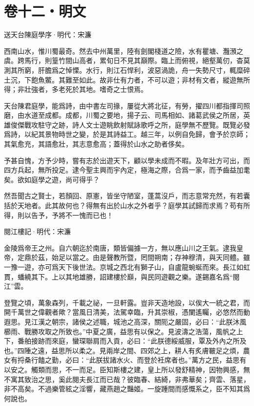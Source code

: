 \documentclass[12pt,a4paper]{ctexbook}
\begin{document}
\section{卷十二・明文}
送天台陳庭學序·明代：宋濂 \par
西南山水，惟川蜀最奇。然去中州萬里，陸有劍閣棧道之險，水有瞿塘、灩澦之虞。跨馬行，則篁竹間山高者，累旬日不見其巔際。臨上而俯視，絕壑萬仞，杳莫測其所窮，肝膽爲之悼慄。水行，則江石悍利，波惡渦詭，舟一失勢尺寸，輒糜碎土沉，下飽魚鱉。其難至如此。故非仕有力者，不可以遊；非材有文者，縱遊無所得；非壯強者，多老死於其地。嗜奇之士恨焉。\par
天台陳君庭學，能爲詩，由中書左司掾，屢從大將北征，有勞，擢四川都指揮司照磨，由水道至成都。成都，川蜀之要地，揚子云、司馬相如、諸葛武侯之所居，英雄俊傑戰攻駐守之跡，詩人文士遊眺飲射賦詠歌呼之所，庭學無不歷覽。既覽必發爲詩，以紀其景物時世之變，於是其詩益工。越三年，以例自免歸，會予於京師；其氣愈充，其語愈壯，其志意愈高；蓋得於山水之助者侈矣。\par
予甚自愧，方予少時，嘗有志於出遊天下，顧以學未成而不暇。及年壯方可出，而四方兵起，無所投足。逮今聖主興而宇內定，極海之際，合爲一家，而予齒益加耄矣。欲如庭學之遊，尚可得乎？\par
然吾聞古之賢士，若顏回、原憲，皆坐守陋室，蓬蒿沒戶，而志意常充然，有若囊括於天地者。此其故何也？得無有出於山水之外者乎？庭學其試歸而求焉？苟有所得，則以告予，予將不一愧而已也！\par
閱江樓記·明代：宋濂 \par
金陵爲帝王之州。自六朝迄於南唐，類皆偏據一方，無以應山川之王氣。逮我皇帝，定鼎於茲，始足以當之。由是聲教所暨，罔間朔南；存神穆清，與天同體。雖一豫一遊，亦可爲天下後世法。京城之西北有獅子山，自盧龍蜿蜒而來。長江如虹貫，蟠繞其下。上以其地雄勝，詔建樓於巔，與民同遊觀之樂。遂錫嘉名爲“閱江”雲。\par
登覽之頃，萬象森列，千載之祕，一旦軒露。豈非天造地設，以俟大一統之君，而開千萬世之偉觀者歟？當風日清美，法駕幸臨，升其崇椒，憑闌遙矚，必悠然而動遐思。見江漢之朝宗，諸侯之述職，城池之高深，關阨之嚴固，必曰：“此朕沐風櫛雨、戰勝攻取之所致也。”中夏之廣，益思有以保之。見波濤之浩蕩，風帆之上下，番舶接跡而來庭，蠻琛聯肩而入貢，必曰：“此朕德綏威服，覃及外內之所及也。”四陲之遠，益思所以柔之。見兩岸之間、四郊之上，耕人有炙膚皸足之煩，農女有捋桑行饁之勤，必曰：“此朕拔諸水火、而登於衽席者也。”萬方之民，益思有以安之。觸類而思，不一而足。臣知斯樓之建，皇上所以發舒精神，因物興感，無不寓其致治之思，奚此閱夫長江而已哉？彼臨春、結綺，非弗華矣；齊雲、落星，非不高矣。不過樂管絃之淫響，藏燕趙之豔姬。一旋踵間而感慨系之，臣不知其爲何說也。\par
\end{document}
